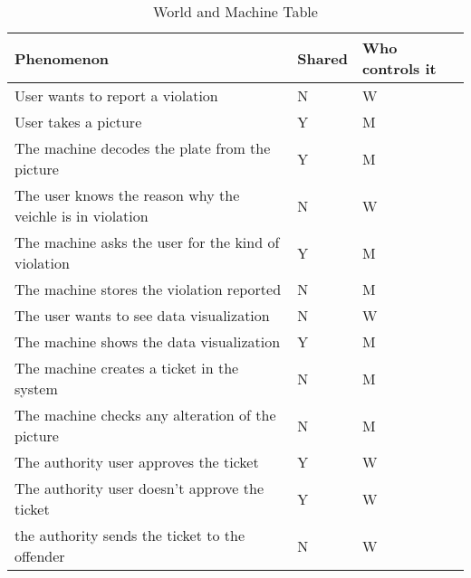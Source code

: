 
\begin{table}[H]
\begin{tabular}{|l|l|l|}
\hline
\textbf{Phenomenon}        & \textbf{Shared} & \textbf{Who controls it} \\ \hline
User wants to report a violation  & N & W                                     \\ \hline
User takes a picture              & Y & M                                   \\ \hline
The machine decodes the plate from the picture   &  Y &   M         \\ \hline
The user knows the reason why the veichle is in violation & N &  W          \\ \hline
The machine asks the user for the kind of violation &Y & M              \\ \hline
The machine stores the violation reported        &  N   &    M           \\ \hline
The user wants to see data visualization  &  N   &    W           \\ \hline
The machine shows the data visualization  &  Y   &    M           \\ \hline
The machine creates a ticket in the system        &  N   &    M           \\ \hline
The machine checks any alteration of the picture       &  N   &    M           \\ \hline
The authority user approves the ticket       &  Y   &    W           \\ \hline
The authority user doesn't approve the ticket       &  Y   &    W         \\ \hline
the authority sends the ticket to the offender & N & W \\ \hline
\end{tabular}

\caption{World and Machine Table}
		\label{WorldMachinetable}
\end{table}
